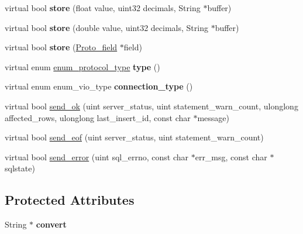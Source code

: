 \begin{DoxyCompactItemize}
\mbox{\label{classProtocol__local_a9a7a85057fedb82a51961099bcfbb6d0}} 
virtual bool {\bfseries store} (float value, uint32 decimals, String $\ast$buffer)
\item 
\mbox{\label{classProtocol__local_ac486a05e1fd456a17020be4090d96ac8}} 
virtual bool {\bfseries store} (double value, uint32 decimals, String $\ast$buffer)
\item 
\mbox{\label{classProtocol__local_ad385a7921004db8b6daf39fc12d35371}} 
virtual bool {\bfseries store} (\mbox{\hyperlink{classProto__field}{Proto\+\_\+field}} $\ast$field)
\item 
\mbox{\label{classProtocol__local_a26afbcce765ae3bf78b985af2e124d7a}} 
virtual enum \mbox{\hyperlink{classProtocol_ab1d147a8122f4ea4f8516ee23c514b02}{enum\+\_\+protocol\+\_\+type}} {\bfseries type} ()
\item 
\mbox{\label{classProtocol__local_ac0efe633339155650ccec637c0ebea78}} 
virtual enum enum\+\_\+vio\+\_\+type {\bfseries connection\+\_\+type} ()
\item 
virtual bool \mbox{\hyperlink{classProtocol__local_ace027ac8707dd2e774e1955319ffe615}{send\+\_\+ok}} (uint server\+\_\+status, uint statement\+\_\+warn\+\_\+count, ulonglong affected\+\_\+rows, ulonglong last\+\_\+insert\+\_\+id, const char $\ast$message)
\item 
virtual bool \mbox{\hyperlink{classProtocol__local_a1aad5312e410648afe13f0ba3d252e36}{send\+\_\+eof}} (uint server\+\_\+status, uint statement\+\_\+warn\+\_\+count)
\item 
virtual bool \mbox{\hyperlink{classProtocol__local_a8f024e3c4a806e4e969ec452126f5769}{send\+\_\+error}} (uint sql\+\_\+errno, const char $\ast$err\+\_\+msg, const char $\ast$sqlstate)
\end{DoxyCompactItemize}
\subsection*{Protected Attributes}
\begin{DoxyCompactItemize}
\item 
\mbox{\label{classProtocol__local_aac627645eeb5c762e7506f50b5c2820b}} 
String $\ast$ {\bfseries convert}
\end{DoxyCompactItemize}
